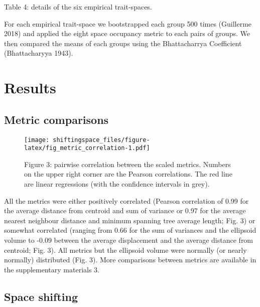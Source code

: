 \documentclass[]{article}
\begin{document}
Table 4: details of the six empirical trait-spaces.

For each empirical trait-space we bootstrapped each group 500 times
(Guillerme 2018) and applied the eight space occupancy metric to each
pairs of groups. We then compared the means of each groups using the
Bhattacharrya Coefficient (Bhattacharyya 1943).

\section{Results}\label{results}

\subsection{Metric comparisons}\label{metric-comparisons-1}

\begin{figure}
\centering
\texttt{[image: shiftingspace\_files/figure-latex/fig\_metric\_correlation-1.pdf]}
\caption{Figure 3: pairwise correlation between the scaled metrics.
Numbers on the upper right corner are the Pearson correlations. The red
line are linear regressions (with the confidence intervals in grey).}
\end{figure}

All the metrics were either positively correlated (Pearson correlation
of 0.99 for the average distance from centroid and sum of variance or
0.97 for the average nearest neighbour distance and minimum spanning
tree average length; Fig. 3) or somewhat correlated (ranging from 0.66
for the sum of variances and the ellipsoid volume to -0.09 between the
average displacement and the average distance from centroid; Fig. 3).
All metrics but the ellipsoid volume were normally (or nearly normally)
distributed (Fig. 3). More comparisons between metrics are available in
the supplementary materials 3.

\subsection{Space shifting}\label{space-shifting}
\end{document}
